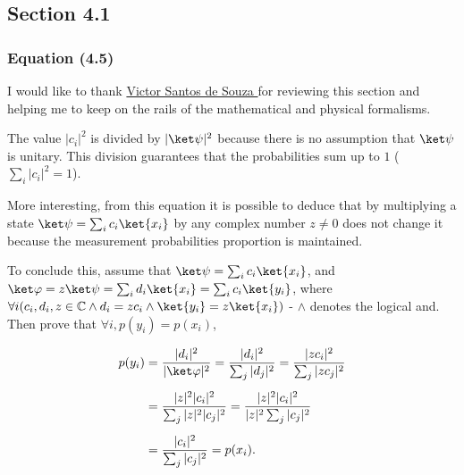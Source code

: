 \subsection{Section 4.1}
\label{sec:noson-section-4-1}

\subsubsection{Equation (4.5)}
\label{sec:noson-equation-4-5}

I would like to thank \hyperlink{http://lattes.cnpq.br/0162506805992681}{
    Victor Santos de Souza
}
for reviewing this section and helping me to keep on the rails of
the mathematical and physical formalisms.

The value $|c_i|^2$ is divided by $|\ket\psi|^2$ because
there is no assumption that $\ket\psi$ is unitary.
This division guarantees that the probabilities sum up to $1$
($\sum_i |c_i|^2 = 1$).

More interesting, from this equation it is possible to deduce that
by multiplying a state $\ket\psi = \sum_i c_i \ket{x_i}$ by
any complex number $z \neq 0$ does not change it
because the measurement probabilities proportion is maintained.

To conclude this, assume that $\ket\psi = \sum_i c_i \ket{x_i}$, and
$\ket\varphi = z \ket\psi = \sum_i d_i \ket{x_i} = \sum_i c_i \ket{y_i}$,
where $\forall i (c_i, d_i, z \in \mathbb{C} \land
d_i = z c_i \land \ket{y_i} = z \ket{x_i})$ -
$\land$ denotes the logical and.
Then prove that $\forall i, p(y_i) = p(x_i)$,

\begin{align}
    p(y_i) &= \frac{|d_i|^2}{|\ket\varphi|^2}
        = \frac{|d_i|^2}{\sum_j|d_j|^2}
        = \frac{|z c_i|^2}{\sum_j|z c_j|^2} 
        \\[5pt]
        &= \frac{|z|^2 |c_i|^2}{\sum_j|z|^2 |c_j|^2}
        = \frac{|z|^2 |c_i|^2}{|z|^2 \sum_j |c_j|^2}
        \\[5pt]
        &= \frac{|c_i|^2}{\sum_j |c_j|^2}
        = p(x_i) .
\end{align}

